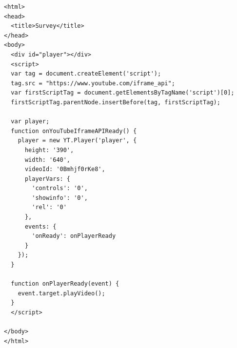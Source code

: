 \begin{frame}[fragile]
\tiny
\begin{verbatim}
<html>
<head>
  <title>Survey</title>
</head>
<body>
  <div id="player"></div>
  <script>
  var tag = document.createElement('script'); 
  tag.src = "https://www.youtube.com/iframe_api";
  var firstScriptTag = document.getElementsByTagName('script')[0];
  firstScriptTag.parentNode.insertBefore(tag, firstScriptTag);
  
  var player;
  function onYouTubeIframeAPIReady() {
    player = new YT.Player('player', {
      height: '390',
      width: '640',
      videoId: '0Bmhjf0rKe8',
      playerVars: {
        'controls': '0',
        'showinfo': '0',
        'rel': '0'
      },
      events: {
        'onReady': onPlayerReady
      }
    });
  }
  
  function onPlayerReady(event) {
    event.target.playVideo();
  }
  </script>
  
</body>
</html>
\end{verbatim}
\end{frame}








